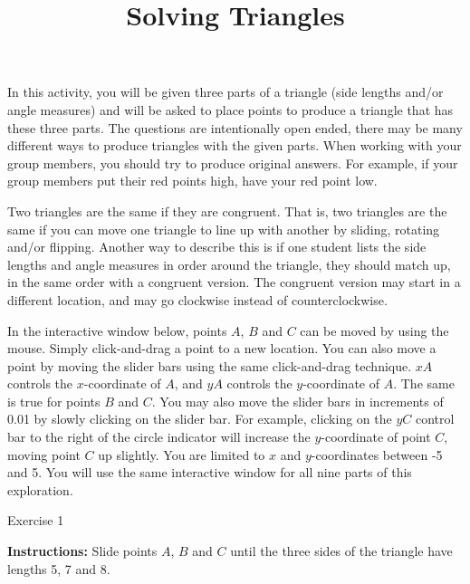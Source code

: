 \documentclass[number]{ximera}
\title{Solving Triangles}
\begin{document}
\maketitle

In this activity, you will be given three parts of a triangle (side lengths and/or angle measures) and will be asked to place points to produce a triangle that has these three parts. The questions are intentionally open ended, there may be many different ways to produce triangles with the given parts. When working with your group members, you should try to produce original answers. For example, if your group members put their red points high, have your red point low.

\bigskip

Two triangles are the same if they are congruent. That is, two triangles are the same if you can move one triangle to line up with another by sliding, rotating and/or flipping. Another way to describe this is if one student lists the side lengths and angle measures in order around the triangle, they should match up, in the same order with a congruent version. The congruent version may start in a different location, and may go clockwise instead of counterclockwise.

In the interactive window below, points $A$, $B$ and $C$ can be moved by using the mouse. Simply click-and-drag a point to a new location. You can also move a point by moving the slider bars using the same click-and-drag technique. $xA$ controls the $x$-coordinate of $A$, and $yA$ controls the $y$-coordinate of $A$. The same is true for points $B$ and $C$. You may also move the slider bars in increments of 0.01 by slowly clicking on the slider bar. For example, clicking on the $yC$ control bar to the right of the circle indicator will increase the $y$-coordinate of point $C$, moving point $C$ up slightly. You are limited to $x$ and $y$-coordinates between -5 and 5. You will use the same interactive window for all nine parts of this exploration.


Exercise 1

{\bf {Instructions:}} Slide points $A$, $B$ and $C$ until the three sides of the triangle have lengths 5, 7 and 8. 
\end{document}
